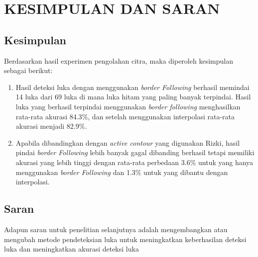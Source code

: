 
\chapter{KESIMPULAN DAN SARAN}

\section{Kesimpulan}
Berdasarkan hasil experimen pengolahan citra, 
maka diperoleh kesimpulan sebagai berikut:

\begin{enumerate}
	\item Hasil deteksi luka dengan menggunakan 
	\textit{border Following} berhasil memindai 14 luka dari 69 
	luka di mana luka hitam yang paling banyak terpindai. Hasil 
	luka yang berhasil terpindai menggunakan \textit{border following} 
	menghasilkan rata-rata akurasi 84.3$\%$, dan setelah menggunakan 
	interpolasi rata-rata akurasi menjadi 82.9$\%$.
	
	\item Apabila dibandingkan dengan \textit{active contour} 
	yang digunakan Rizki, hasil pindai \textit{border Following} 
	lebih banyak gagal dibanding berhasil tetapi memiliki akurasi 
	yang lebih tinggi dengan rata-rata perbedaan 3.6$\%$ untuk 
	yang hanya menggunakan \textit{border Following} dan 1.3$\%$ 
	untuk yang dibantu dengan interpolasi.
\end{enumerate}

\section{Saran}
Adapun saran untuk penelitian selanjutnya adalah 
mengembangkan atau mengubah metode pendeteksian luka 
untuk meningkatkan keberhasilan deteksi luka dan 
meningkatkan akurasi deteksi luka


\begin{comment}

\end{comment}
